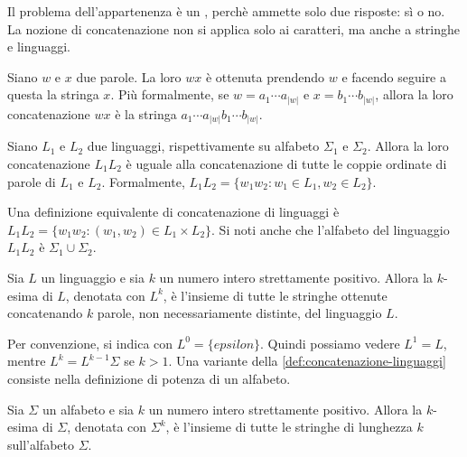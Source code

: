 Il problema dell'appartenenza è un , perchè
ammette solo due risposte: sì o no.
La nozione di  concatenazione non si applica solo ai caratteri, ma anche a stringhe e linguaggi.


\begin{definition}[Concatenazione]\label{def:concatenazione-parole}
Siano $w$ e $x$ due parole.
La loro  $wx$ è ottenuta prendendo $w$ e facendo seguire a questa la stringa  $x$.
Più formalmente, se $w=a_{1}\cdots a_{|w|}$ e $x=b_{1}\cdots b_{|w|}$, allora la loro concatenazione $wx$ è la stringa
$a_{1}\cdots a_{|w|} b_{1}\cdots b_{|w|}$.
\end{definition}

\begin{definition}\label{def:concatenazione-linguaggi}
Siano $L_{1}$ e $L_{2}$ due linguaggi, rispettivamente su alfabeto $\Sigma_{1}$ e $\Sigma_{2}$.
Allora la loro concatenazione $L_{1}L_{2}$ è uguale alla concatenazione di tutte le coppie ordinate di parole di $L_{1}$
e $L_2$.
Formalmente, $L_{1}L_{2} = \{ w_{1}w_2 : w_{1}\in L_{1}, w_{2}\in L_2\}$.
\end{definition}

Una definizione equivalente di concatenazione di linguaggi è $L_{1}L_{2} = \{ w_{1}w_2 : (w_{1}, w_{2})\in L_{1} \times L_2\}$.
Si noti anche che l'alfabeto del linguaggio $L_1 L_2$ è $\Sigma_{1} \cup \Sigma_{2}$.


\begin{definition}\label{def:potenza-linguaggio}
Sia $L$ un linguaggio e sia $k$ un numero intero strettamente positivo.
Allora la $k$-esima  di $L$, denotata con $L^k$, è l'insieme di tutte le stringhe ottenute concatenando
$k$ parole, non necessariamente distinte, del linguaggio $L$.
\end{definition}

Per convenzione, si indica con $L^{0} = \{ epsilon \}$.
Quindi possiamo vedere $L^{1} =L$, mentre $L^{k} = L^{k-1} \Sigma$ se $k>1$.
Una variante della \cref{def:concatenazione-linguaggi} consiste nella definizione di potenza di un alfabeto.

\begin{definition}\label{def:potenza-alfabeto}
Sia $\Sigma$ un alfabeto e sia $k$ un numero intero strettamente positivo.
Allora la $k$-esima  di $\Sigma$, denotata con $\Sigma^k$, è l'insieme di tutte le stringhe di
lunghezza $k$ sull'alfabeto $\Sigma$.
\end{definition}

